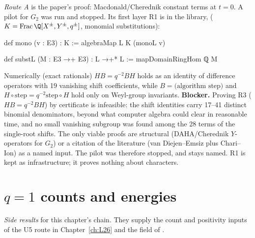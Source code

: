 \begin{warning}[title={The stopped Route A pilot for $G_2$}]
\emph{Route A} is the paper's proof: Macdonald/Cherednik constant terms at $t=0$. A pilot for $G_2$ was run and
stopped. Its first layer R1 is in the library, 
($K=\mathrm{Frac}\,\Q[X^{\pm},Y^{\pm},q^{\pm}]$, monomial substitutions):
\begin{leancode}
def mono (v : E3) : K := algebraMap L K (monoL v)

def substL (M : E3 →+ E3) : L →+* L := mapDomainRingHom ℚ M
\end{leancode}
Numerically (exact rationals) $HB=q^{-2}BH$ holds as an identity of difference operators with 19 vanishing shift
coefficients, while $B=\text{(algorithm step)}$ and $H\circ\text{step}=q^{-2}\text{step}\circ H$ hold only on
Weyl-group invariants. \textbf{Blocker.} Proving R3 ($HB=q^{-2}BH$) by certificate is infeasible: the shift identities
carry 17--41 distinct binomial denominators, beyond what computer algebra could clear in reasonable time, and no
small vanishing subgroup was found among the 28 terms of the single-root shifts. The only viable proofs are
structural (DAHA/Cherednik $Y$-operators for $G_2$) or a citation of the literature (van Diejen--Emsiz plus Chari--Ion)
as a named input. The pilot was therefore stopped, and  stays named. R1 is kept as infrastructure;
it proves nothing about characters.
\end{warning}

\section{\texorpdfstring{$q=1$}{q=1} counts and energies}\label{l25:sec:counts}

\noindent\emph{Side results} for this chapter's chain. They supply the count and positivity inputs of the U5 route in
Chapter~\ref{ch:L26} and the  field of .

